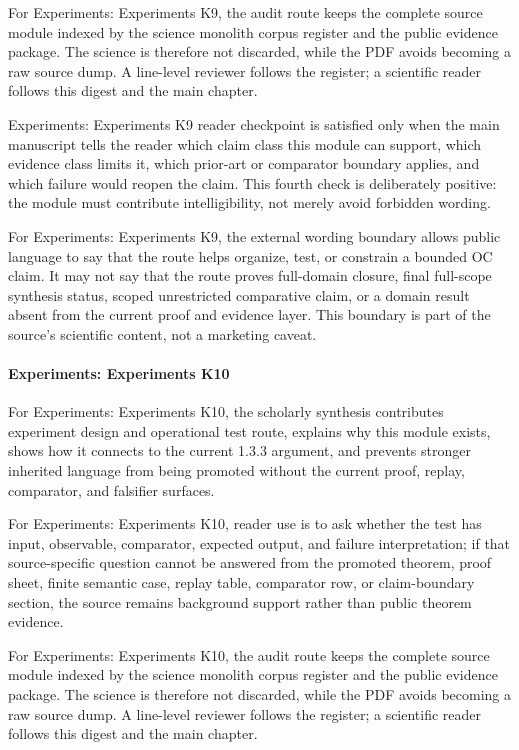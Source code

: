 For Experiments: Experiments K9, the audit route keeps the complete source module indexed by the science monolith corpus register and the public evidence package. The science is therefore not discarded, while the PDF avoids becoming a raw source dump. A line-level reviewer follows the register; a scientific reader follows this digest and the main chapter.


Experiments: Experiments K9 reader checkpoint is satisfied only when the main manuscript tells the reader which claim class this module can support, which evidence class limits it, which prior-art or comparator boundary applies, and which failure would reopen the claim. This fourth check is deliberately positive: the module must contribute intelligibility, not merely avoid forbidden wording.


For Experiments: Experiments K9, the external wording boundary allows public language to say that the route helps organize, test, or constrain a bounded OC claim. It may not say that the route proves full-domain closure, final full-scope synthesis status, scoped unrestricted comparative claim, or a domain result absent from the current proof and evidence layer. This boundary is part of the source's scientific content, not a marketing caveat.


\paragraph{Experiments: Experiments K10}

For Experiments: Experiments K10, the scholarly synthesis contributes experiment design and operational test route, explains why this module exists, shows how it connects to the current 1.3.3 argument, and prevents stronger inherited language from being promoted without the current proof, replay, comparator, and falsifier surfaces.


For Experiments: Experiments K10, reader use is to ask whether the test has input, observable, comparator, expected output, and failure interpretation; if that source-specific question cannot be answered from the promoted theorem, proof sheet, finite semantic case, replay table, comparator row, or claim-boundary section, the source remains background support rather than public theorem evidence.


For Experiments: Experiments K10, the audit route keeps the complete source module indexed by the science monolith corpus register and the public evidence package. The science is therefore not discarded, while the PDF avoids becoming a raw source dump. A line-level reviewer follows the register; a scientific reader follows this digest and the main chapter.


